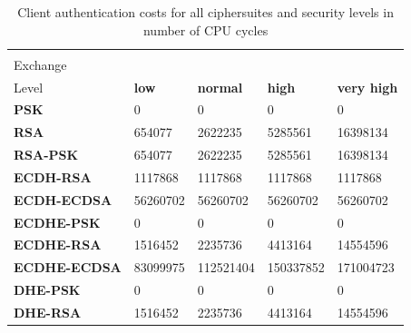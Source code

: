   \begin{table}[]
	\begin{tabular}{|l|l|l|l|l|}
	\hline
	 \backslashbox{Key\\Exchange}{Security\\Level}                     & \textbf{low} & \textbf{normal} & \textbf{high} & \textbf{very high} \\ \hline
	\textbf{PSK}         & 0            & 0               & 0             & 0                  \\ \hline
	\textbf{RSA}         & 654077       & 2622235         & 5285561       & 16398134           \\ \hline
	\textbf{RSA-PSK}     & 654077       & 2622235         & 5285561       & 16398134           \\ \hline
	\textbf{ECDH-RSA}    & 1117868      & 1117868         & 1117868       & 1117868           \\ \hline
	\textbf{ECDH-ECDSA}  & 56260702     & 56260702        & 56260702      & 56260702          \\ \hline
	\textbf{ECDHE-PSK}   & 0            & 0               & 0             & 0                  \\ \hline
	\textbf{ECDHE-RSA}   & 1516452       & 2235736         & 4413164       & 14554596           \\ \hline
	\textbf{ECDHE-ECDSA} & 83099975     & 112521404       & 150337852     & 171004723          \\ \hline
	\textbf{DHE-PSK}     & 0            & 0               & 0             & 0                  \\ \hline
	\textbf{DHE-RSA}     & 1516452       & 2235736         & 4413164       & 14554596           \\ \hline
	\end{tabular}
	\centering \caption{\label{table:tls-auth-cost-client} Client authentication costs for all ciphersuites and security levels in number of CPU cycles}
	\end{table}
  

